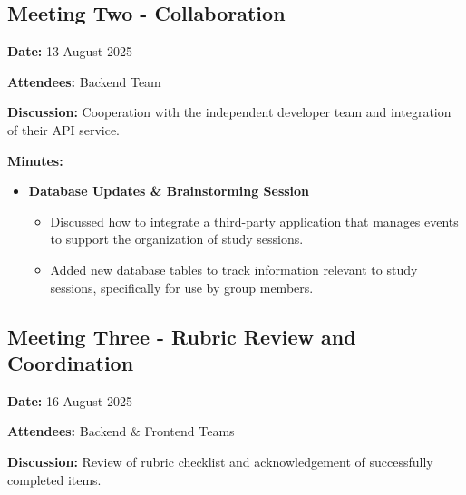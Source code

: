 \subsection{Meeting Two - Collaboration}

\textbf{Date:} 13 August 2025 \par
\textbf{Attendees:} Backend Team \par
\textbf{Discussion:} Cooperation with the independent developer team and integration of their API service. \par

\textbf{Minutes:}
\begin{itemize}
    \item \textbf{Database Updates \& Brainstorming Session}
    \begin{itemize}
        \item Discussed how to integrate a third-party application that manages events to support the organization of study sessions.
        \item Added new database tables to track information relevant to study sessions, specifically for use by group members.
    \end{itemize}
\end{itemize}


\subsection{Meeting Three - Rubric Review and Coordination}

\textbf{Date:} 16 August 2025 \par
\textbf{Attendees:} Backend \& Frontend Teams \par
\textbf{Discussion:} Review of rubric checklist and acknowledgement of successfully completed items. \par

